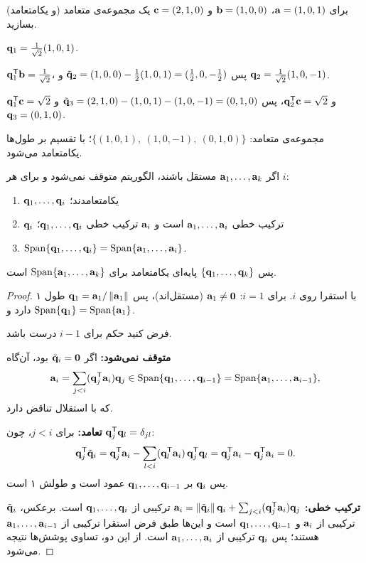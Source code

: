 \begin{example}
برای $\mathbf{a}=(1,0,1)$، $\mathbf{b}=(1,0,0)$ و $\mathbf{c}=(2,1,0)$ یک مجموعه‌ی متعامد (و یکامتعامد) بسازید.
\end{example}
\begin{solution}
$\mathbf{q}_1=\frac{1}{\sqrt2}(1,0,1)$.

$\mathbf{q}_1^{\mathsf{T}}\mathbf{b}=\frac1{\sqrt2}$، پس $\tilde{\mathbf{q}}_2=(1,0,0)-\frac12(1,0,1)=(\frac12,0,-\frac12)$ و $\mathbf{q}_2=\frac1{\sqrt2}(1,0,-1)$.

$\mathbf{q}_1^{\mathsf{T}}\mathbf{c}=\sqrt2$ و $\mathbf{q}_2^{\mathsf{T}}\mathbf{c}=\sqrt2$، پس
$\tilde{\mathbf{q}}_3=(2,1,0)-(1,0,1)-(1,0,-1)=(0,1,0)$ و $\mathbf{q}_3=(0,1,0)$.

مجموعه‌ی متعامد: $\{(1,0,1),\ (1,0,-1),\ (0,1,0)\}$؛ با تقسیم بر طول‌ها یکامتعامد می‌شود.
\end{solution}

\begin{theorem}\label{thm:gram-schmidt}
اگر $\mathbf{a}_1,\dots,\mathbf{a}_k$ مستقل باشند، الگوریتم متوقف نمی‌شود و برای هر $i$:
\begin{enumerate}
  \item $\mathbf{q}_1,\dots,\mathbf{q}_i$ یکامتعامدند؛
  \item $\mathbf{q}_i$ ترکیب خطی $\mathbf{a}_1,\dots,\mathbf{a}_i$ است و $\mathbf{a}_i$ ترکیب خطی $\mathbf{q}_1,\dots,\mathbf{q}_i$؛
  \item $\operatorname{Span}\{\mathbf{q}_1,\dots,\mathbf{q}_i\}=\operatorname{Span}\{\mathbf{a}_1,\dots,\mathbf{a}_i\}$.
\end{enumerate}
پس $\{\mathbf{q}_1,\dots,\mathbf{q}_k\}$ پایه‌ای یکامتعامد برای $\operatorname{Span}\{\mathbf{a}_1,\dots,\mathbf{a}_k\}$ است.
\end{theorem}
\begin{proof}
با استقرا روی $i$. برای $i=1$: $\mathbf{a}_1\neq\mathbf{0}$ (مستقل‌اند)، پس $\mathbf{q}_1=\mathbf{a}_1/\left\lVert \mathbf{a}_1\right\rVert$ طول ۱ دارد و $\operatorname{Span}\{\mathbf{q}_1\}=\operatorname{Span}\{\mathbf{a}_1\}$.

فرض کنید حکم برای $i-1$ درست باشد.

\textbf{متوقف نمی‌شود:} اگر $\tilde{\mathbf{q}}_i=\mathbf{0}$ بود، آن‌گاه
\[
\mathbf{a}_i=\sum_{j<i}(\mathbf{q}_j^{\mathsf{T}}\mathbf{a}_i)\mathbf{q}_j\in\operatorname{Span}\{\mathbf{q}_1,\dots,\mathbf{q}_{i-1}\}=\operatorname{Span}\{\mathbf{a}_1,\dots,\mathbf{a}_{i-1}\},
\]
که با استقلال تناقض دارد.

\textbf{تعامد:} برای $j<i$، چون $\mathbf{q}_j^{\mathsf{T}}\mathbf{q}_l=\delta_{jl}$:
\[
\mathbf{q}_j^{\mathsf{T}}\tilde{\mathbf{q}}_i=\mathbf{q}_j^{\mathsf{T}}\mathbf{a}_i-\sum_{l<i}(\mathbf{q}_l^{\mathsf{T}}\mathbf{a}_i)\,\mathbf{q}_j^{\mathsf{T}}\mathbf{q}_l=\mathbf{q}_j^{\mathsf{T}}\mathbf{a}_i-\mathbf{q}_j^{\mathsf{T}}\mathbf{a}_i=0 .
\]
پس $\mathbf{q}_i$ بر $\mathbf{q}_1,\dots,\mathbf{q}_{i-1}$ عمود است و طولش ۱ است.

\textbf{ترکیب خطی:} $\mathbf{a}_i=\left\lVert \tilde{\mathbf{q}}_i\right\rVert\mathbf{q}_i+\sum_{j<i}(\mathbf{q}_j^{\mathsf{T}}\mathbf{a}_i)\mathbf{q}_j$ ترکیبی از $\mathbf{q}_1,\dots,\mathbf{q}_i$ است. برعکس، $\tilde{\mathbf{q}}_i$ ترکیبی از $\mathbf{a}_i$ و $\mathbf{q}_1,\dots,\mathbf{q}_{i-1}$ است و این‌ها طبق فرض استقرا ترکیبی از $\mathbf{a}_1,\dots,\mathbf{a}_{i-1}$ هستند؛ پس $\mathbf{q}_i$ ترکیبی از $\mathbf{a}_1,\dots,\mathbf{a}_i$ است. از این دو، تساوی پوشش‌ها نتیجه می‌شود.
\end{proof}

